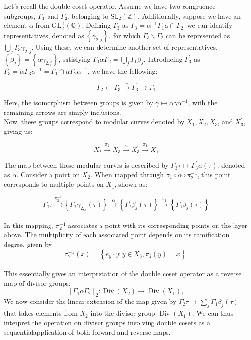  Let's recall the double coset operator. Assume we have two congruence subgroups, $\Gamma_{1}$ and $\Gamma_{2}$, belonging to $\mathrm{SL}_{2}(\mathbb{Z})$. Additionally, suppose we have an element $\alpha$ from $\mathrm{GL}_{2}^{+}(\mathbb{Q})$. Defining $\Gamma_{3}$ as $\Gamma_{3}=\alpha^{-1} \Gamma_{1} \alpha \cap \Gamma_{2}$, we can identify representatives, denoted as $\left\{\gamma_{2, j}\right\}$, for which $\Gamma_{3} \backslash \Gamma_{2}$ can be represented as $\bigcup_{j} \Gamma_{3} \gamma_{2, j}$. Using these, we can determine another set of representatives, $\left\{\beta_{j}\right\}=\left\{\alpha \gamma_{2, j}\right\}$, satisfying $\Gamma_{1} \alpha \Gamma_{2}=\bigcup_{j} \Gamma_{1} \beta_{j}$. Introducing $\Gamma_{3}^{\prime}$ as $\Gamma_{3}^{\prime}=\alpha \Gamma_{3} \alpha^{-1}=\Gamma_{1} \cap \alpha \Gamma_{2} \alpha^{-1}$, we have the following:

$$
\Gamma_{2} \longleftarrow \Gamma_{3} \stackrel{\sim}{\longrightarrow} \Gamma_{3}^{\prime} \longrightarrow \Gamma_{1}
$$

Here, the isomorphism between groups is given by $\gamma \mapsto \alpha \gamma \alpha^{-1}$, with the remaining arrows are simply inclusions. \\
Now, these groups correspond to modular curves denoted by $X_{1}, X_{2}, X_{3}$, and $X_{3}^{\prime}$, giving us:

$$
X_{2} \stackrel{\pi_{2}}{\longrightarrow} X_{3} \stackrel{\sim}{\longrightarrow} X_{3}^{\prime} \stackrel{\pi_{1}}{\longrightarrow} X_{1}
$$

The map between these modular curves is described by $\Gamma_{3} \tau \mapsto \Gamma_{3}^{\prime} \alpha(\tau)$, denoted as $\alpha$. Consider a point on $X_{2}$. When mapped through $\pi_{1} \circ \alpha \circ \pi_{2}^{-1}$, this point corresponds to multiple points on $X_{1}$, shown as:

$$
\Gamma_{2} \tau \stackrel{\pi_{2}^{-1}}{\longrightarrow}\left\{\Gamma_{3} \gamma_{2, j}(\tau)\right\} \stackrel{\alpha}{\longrightarrow}\left\{\Gamma_{3}^{\prime} \beta_{j}(\tau)\right\} \stackrel{\pi_{1}}{\longrightarrow}\left\{\Gamma_{1} \beta_{j}(\tau)\right\}
$$
\\
In this mapping, $\pi_{2}^{-1}$ associates a point with its corresponding points on the layer above. The multiplicity of each associated point depends on its ramification degree, given by $$\pi_{2}^{-1}(x)=\left\{e_{y} \cdot y: y \in X_{3}, \pi_{2}(y)=x\right\}.$$ \\
This essentially gives an interpretation of the double coset operator as a reverse map of divisor groups: 
$$
\left[\Gamma_{1} \alpha \Gamma_{2}\right]_{2}: \operatorname{Div}\left(X_{2}\right) \longrightarrow \operatorname{Div}\left(X_{1}\right),
$$
We now consider the linear extension of the map given by \( \Gamma_{2} \tau \mapsto \sum_{j} \Gamma_{1} \beta_{j}(\tau) \) that takes elements from \( X_{2} \) into the divisor group \( \operatorname{Div}(X_{1}) \). We can thus interpret the operation on divisor groups involving double cosets as a sequentialapplication of both forward and reverse maps. 

